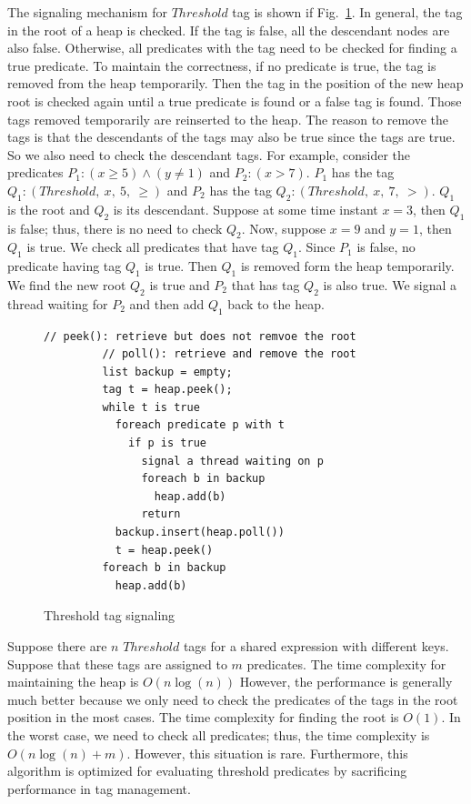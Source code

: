 \documentclass{sigplanconf}
\begin{document}
The signaling mechanism for $Threshold$ tag is shown if Fig.~\ref{fig:th_sig}. In
general, the tag in the root of a heap is checked. If the tag is false, all the
descendant nodes are also false. Otherwise, all predicates with the tag
need to be checked for finding a true predicate. To maintain the correctness, 
if no predicate is true, the tag is removed from the heap temporarily. Then the
tag in the position of the new heap root is checked again until a true predicate is found or a
false tag is found. Those tags removed temporarily are reinserted to the heap.
The reason to remove the tags is that the descendants of the tags may also be
true since the tags are true. So we also need to check the descendant tags. For
example, consider the predicates $P_1: (x \ge 5) \wedge (y \ne 1)$ and 
$P_2: (x > 7)$. $P_1$ has the tag $Q_1: (Threshold,\ x,\ 5,\ \ge)$ and $P_2$
has the tag $Q_2: (Threshold,\ x,\ 7,\ >)$. $Q_1$ is the root and $Q_2$ is its
descendant. Suppose at some time instant $x=3$, then $Q_1$ is false; thus, there is no
need to check $Q_2$. Now, suppose $x = 9$ and $y = 1$, then $Q_1$ is true. We
check all predicates that have tag $Q_1$.  Since $P_1$ is false, no predicate
having tag $Q_1$ is true. Then $Q_1$ is removed form the heap temporarily. We find the
new root $Q_2$ is true and $P_2$ that has tag $Q_2$ is also true. We signal 
a thread waiting for $P_2$ and then add $Q_1$ back to the heap. 

\begin{figure}[ht!]
    \begin{Verbatim}[fontsize=\footnotesize,gobble=8,frame=lines,
            framesep=3mm]
         // peek(): retrieve but does not remvoe the root 
         // poll(): retrieve and remove the root 
         list backup = empty;
         tag t = heap.peek();
         while t is true
           foreach predicate p with t
             if p is true
               signal a thread waiting on p
               foreach b in backup 
                 heap.add(b)
               return 
           backup.insert(heap.poll())
           t = heap.peek()
         foreach b in backup 
           heap.add(b)
    \end{Verbatim}
  \caption{Threshold tag signaling}
  \label{fig:th_sig}
\end{figure}


Suppose there are $n$ $Threshold$ tags for a shared expression with different 
keys. Suppose that these tags are assigned to $m$ predicates. The time 
complexity for maintaining the heap is $O(n \log(n))$ 
However, the performance is generally much better because we only
need to check the predicates of the tags in the root position in the most
cases. The time complexity for finding the root is $O(1)$. In the worst case, 
we need to check all predicates; thus, the time complexity is $O(n \log(n) + m)$. 
However, this situation is rare. Furthermore, this algorithm is optimized for
evaluating threshold predicates by sacrificing performance in tag management.  
\end{document}
